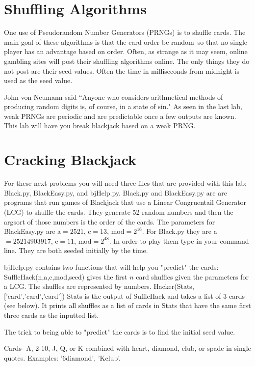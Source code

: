 \section*{Shuffling Algorithms}

One use of Pseudorandom Number Generators (PRNGs) is to shuffle cards.
The main goal of these algorithms is that the card order be random--so that no single player has an advantage based on order.
Often, as strange as it may seem, online gambling sites will post their shuffling algorithms online.
The only things they do not post are their seed values.
Often the time in milliseconds from midnight is used as the seed value.

John von Neumann said ``Anyone who considers arithmetical methods of producing random digits is, of course, in a state of sin."
As seen in the last lab, weak PRNGs are periodic and are predictable once a few outputs are known.
This lab will have you break blackjack based on a weak PRNG.

\section*{Cracking Blackjack}
For these next problems you will need three files that are provided with this lab: Black.py, BlackEasy.py, and bjHelp.py.
Black.py and BlackEasy.py are are programs that run games of Blackjack that use a Linear Congruentail Generator (LCG) to shuffle the cards.
They generate 52 random numbers and then the argsort of those numbers is the order of the cards.
The parameters for BlackEasy.py are a$=2521$, c$=13$, mod$=2^{16}$.
For Black.py they are a$=25214903917$, c$=11$, mod$=2^{48}$.
In order to play them type  in your command line.
They are both seeded initially by the time.

bjHelp.py contains two functions that will help you "predict" the cards:
SuffleHack(n,a,c,mod,seed) gives the first $n$ card shuffles given the parameters for a LCG.
The shuffles are represented by numbers.
Hacker(Stats,['card','card','card']) Stats is the output of SuffleHack and takes a list of 3 cards (see below).
It prints all shuffles as a list of cards in Stats that have the same first three cards as the inputted list.

The trick to being able to "predict" the cards is to find the initial seed value.

Cards- A, 2-10, J, Q, or K combined with heart, diamond, club, or spade in single quotes.
Examples: '6diamond', 'Kclub'.


